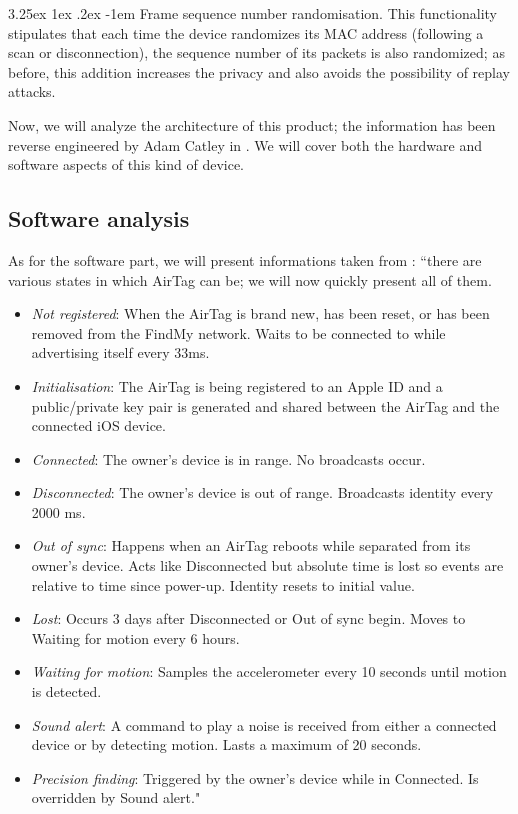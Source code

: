 \documentclass[english]{article}
\makeatletter
\renewcommand\paragraph{\@startsection{paragraph}{5}{\z@}%
  {3.25ex \@plus1ex \@minus.2ex}%
  {-1em}%
  {\normalfont\normalsize\bfseries}}
\makeatother
\begin{document}
\paragraph{Frame sequence number randomisation.}
This functionality stipulates that each time the device randomizes its MAC address (following a scan or disconnection), the sequence number of its packets is also randomized; as before, this addition increases the privacy and also avoids the possibility of replay attacks.


Now, we will analyze the architecture of this product; the information has been reverse engineered by Adam Catley in \cite{reverse}. We will cover both the hardware and software aspects of this kind of device.
\subsection{Software analysis}\label{sec:beacons}
As for the software part, we will present informations taken from \cite{reverse}: ``there are various states in which AirTag can be; we will now quickly present all of them.
\begin{itemize}
  \item \textit{Not registered}: When the AirTag is brand new, has been reset, or has been removed from the FindMy network. Waits to be connected to while advertising itself every 33ms.
  \item \textit{Initialisation}: The AirTag is being registered to an Apple ID and a public/private key pair is generated and shared between the AirTag and the connected iOS device.
  \item \textit{Connected}: The owner’s device is in range. No broadcasts occur.
  \item \textit{Disconnected}: The owner’s device is out of range. Broadcasts identity every 2000 ms.
  \item \textit{Out of sync}: Happens when an AirTag reboots while separated from its owner’s device. Acts like Disconnected but absolute time is lost so events are relative to time since power-up. Identity resets to initial value.
  \item \textit{Lost}: Occurs 3 days after Disconnected or Out of sync begin. Moves to Waiting for motion every 6 hours.
  \item \textit{Waiting for motion}: Samples the accelerometer every 10 seconds until motion is detected.
  \item \textit{Sound alert}: A command to play a noise is received from either a connected device or by detecting motion. Lasts a maximum of 20 seconds.
  \item \textit{Precision finding}: Triggered by the owner’s device while in Connected. Is overridden by Sound alert."
\end{itemize}
\end{document}

